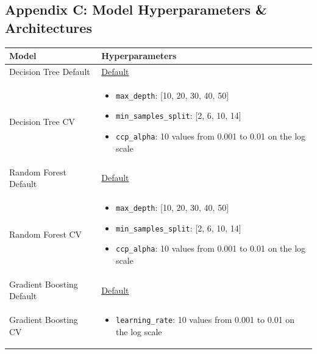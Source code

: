 \documentclass{article}
\begin{document}
\pagebreak

\subsection*{Appendix C: Model Hyperparameters \& Architectures}\label{sec:hyperparameters}

\begin{table}[htbp]
    \centering
    \begin{tabular}{l p{}}
        \toprule
        \textbf{Model} & \textbf{Hyperparameters} \\
        \midrule
        Decision Tree Default & \href{https://scikit-learn.org/stable/modules/generated/sklearn.tree.DecisionTreeClassifier.html#sklearn.tree.DecisionTreeClassifier}{Default} \\[3pt]
        Decision Tree CV & \begin{itemize}
            \item \texttt{max\_depth}: [10, 20, 30, 40, 50]
            \item \texttt{min\_samples\_split}: [2, 6, 10, 14]
            \item \texttt{ccp\_alpha}: 10 values from 0.001 to 0.01 on the log scale
        \end{itemize} \\[3pt]
        Random Forest Default & \href{https://scikit-learn.org/stable/modules/generated/sklearn.ensemble.RandomForestClassifier.html#sklearn-ensemble-randomforestclassifier}{Default} \\[3pt]
        Random Forest CV & \begin{itemize}
            \item \texttt{max\_depth}: [10, 20, 30, 40, 50]
            \item \texttt{min\_samples\_split}: [2, 6, 10, 14]
            \item \texttt{ccp\_alpha}: 10 values from 0.001 to 0.01 on the log scale
        \end{itemize} \\[3pt]
        Gradient Boosting Default & \href{https://scikit-learn.org/stable/modules/generated/sklearn.ensemble.GradientBoostingClassifier.html#sklearn-ensemble-gradientboostingclassifier}{Default} \\[3pt]
        Gradient Boosting CV & \begin{itemize}
            \item \texttt{learning\_rate}: 10 values from 0.001 to 0.01 on the log scale
        \end{itemize} \\[3pt]

\end{tabular}
\end{table}
\end{document}

